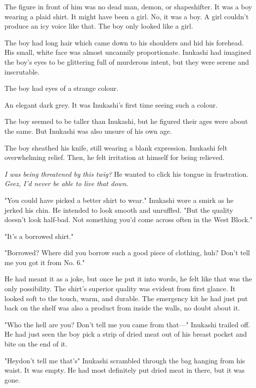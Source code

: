 The figure in front of him was no dead man, demon, or shapeshifter. It
was a boy wearing a plaid shirt. It might have been a girl. No, it was a
boy. A girl couldn't produce an icy voice like that. The boy only looked
like a girl.

The boy had long hair which came down to his shoulders and hid his
forehead. His small, white face was almost uncannily proportionate.
Inukashi had imagined the boy's eyes to be glittering full of murderous
intent, but they were serene and inscrutable.

The boy had eyes of a strange colour.

An elegant dark grey. It was Inukashi's first time seeing such a colour.

The boy seemed to be taller than Inukashi, but he figured their ages
were about the same. But Inukashi was also unsure of his own age.

The boy sheathed his knife, still wearing a blank expression. Inukashi
felt overwhelming relief. Then, he felt irritation at himself for being
relieved.

\emph{I was being threatened by this twig?} He wanted to click his tongue in
frustration. \emph{Geez, I'd never be able to live that down.}

"You could have picked a better shirt to wear." Inukashi wore a smirk as
he jerked his chin. He intended to look smooth and unruffled. "But the
quality doesn't look half-bad. Not something you'd come across often in
the West Block."

"It's a borrowed shirt."

"Borrowed? Where did you borrow such a good piece of clothing, huh?
Don't tell me you got it from No. 6."

He had meant it as a joke, but once he put it into words, he felt like
that was the only possibility. The shirt's superior quality was evident
from first glance. It looked soft to the touch, warm, and durable. The
emergency kit he had just put back on the shelf was also a product from
inside the walls, no doubt about it.

"Who the hell are you? Don't tell me you came from that---" Inukashi
trailed off. He had just seen the boy pick a strip of dried meat out of
his breast pocket and bite on the end of it.

"Hey\el don't tell me that's\el " Inukashi scrambled through the bag
hanging from his waist. It was empty. He had most definitely put dried
meat in there, but it was gone.

